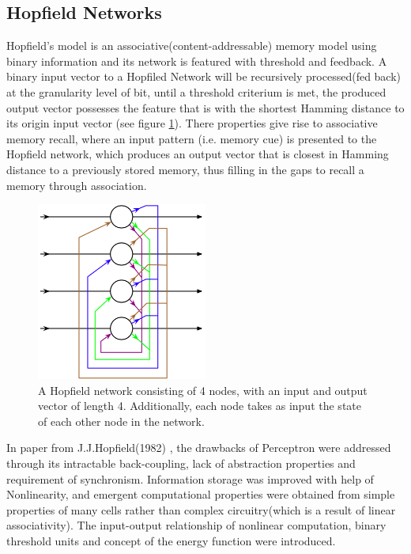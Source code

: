 \documentclass[12pt, a4paper]{article}
\begin{document}
\subsection{Hopfield Networks}

Hopfield's model is an associative(content-addressable) memory model using binary information and its network is featured with threshold and feedback. A binary input vector to a Hopfiled Network will be recursively processed(fed back) at the granularity level of bit, until a threshold criterium is met, the produced output vector possesses the feature that is with the shortest Hamming distance to its origin input vector (see figure \ref{fig:hopfield_network}). There properties give rise to associative memory recall, where an input pattern (i.e. memory cue) is presented to the Hopfield network, which produces an output vector that is closest in Hamming distance to a previously stored memory, thus filling in the gaps to recall a memory through association.

\begin{figure}[htbp]
	\begin{center}
		\includegraphics[width=0.5\textwidth]{inc/hopfield_network.png}
		\caption{A Hopfield network consisting of 4 nodes, with an input and output vector of length 4. Additionally, each node takes as input the state of each other node in the network.\protect\footnotemark}
		\label{fig:hopfield_network}
	\end{center}
\end{figure}

In paper from J.J.Hopfield(1982) \cite{computational_abilities}, the drawbacks of Perceptron were addressed through its intractable back-coupling, lack of abstraction properties and requirement of synchronism. Information storage was improved with help of Nonlinearity, and emergent computational properties were obtained from simple properties of many cells rather than complex circuitry(which is a result of linear associativity). The input-output relationship of nonlinear computation, binary threshold units and concept of the energy function were introduced.
\end{document}
